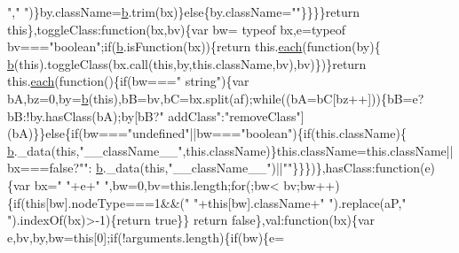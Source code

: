 \begin{DoxyCode}
{       "},\textcolor{stringliteral}{" "})\}by.className=\hyperlink{a00039_aa4026ad5544b958e54ce5e106fa1c805}{b}.trim(bx)\}\textcolor{keywordflow}{else}\{by.className=\textcolor{stringliteral}{""}\}\}\}\}\textcolor{keywordflow}{return} \textcolor{keyword}{this}\},toggleClass:\textcolor{keyword}{function}(bx,bv)\{var bw=
      typeof bx,e=typeof bv===\textcolor{stringliteral}{"boolean"};\textcolor{keywordflow}{if}(\hyperlink{a00039_aa4026ad5544b958e54ce5e106fa1c805}{b}.isFunction(bx))\{\textcolor{keywordflow}{return} this.\hyperlink{a00039_a871ff39db627c54c710a3e9909b8234c}{each}(\textcolor{keyword}{function}(by)\{
      \hyperlink{a00039_aa4026ad5544b958e54ce5e106fa1c805}{b}(\textcolor{keyword}{this}).toggleClass(bx.call(\textcolor{keyword}{this},by,\textcolor{keyword}{this}.className,bv),bv)\})\}\textcolor{keywordflow}{return} this.\hyperlink{a00039_a871ff39db627c54c710a3e9909b8234c}{each}(\textcolor{keyword}{function}()\{\textcolor{keywordflow}{if}(bw===\textcolor{stringliteral}{"
      string"})\{var bA,bz=0,by=\hyperlink{a00039_aa4026ad5544b958e54ce5e106fa1c805}{b}(\textcolor{keyword}{this}),bB=bv,bC=bx.split(af);\textcolor{keywordflow}{while}((bA=bC[bz++]))\{bB=e?bB:!by.hasClass(bA);by[bB?\textcolor{stringliteral}{"
      addClass"}:\textcolor{stringliteral}{"removeClass"}](bA)\}\}\textcolor{keywordflow}{else}\{\textcolor{keywordflow}{if}(bw===\textcolor{stringliteral}{"undefined"}||bw===\textcolor{stringliteral}{"boolean"})\{\textcolor{keywordflow}{if}(this.className)\{
      \hyperlink{a00039_aa4026ad5544b958e54ce5e106fa1c805}{b}.\_data(\textcolor{keyword}{this},\textcolor{stringliteral}{"\_\_className\_\_"},this.className)\}this.className=this.className||bx===\textcolor{keyword}{false}?\textcolor{stringliteral}{""}:
      \hyperlink{a00039_aa4026ad5544b958e54ce5e106fa1c805}{b}.\_data(\textcolor{keyword}{this},\textcolor{stringliteral}{"\_\_className\_\_"})||\textcolor{stringliteral}{""}\}\}\})\},hasClass:\textcolor{keyword}{function}(e)\{var bx=\textcolor{stringliteral}{" "}+e+\textcolor{stringliteral}{" "},bw=0,bv=this.length;\textcolor{keywordflow}{for}(;bw<
      bv;bw++)\{\textcolor{keywordflow}{if}(\textcolor{keyword}{this}[bw].nodeType===1&&(\textcolor{stringliteral}{" "}+\textcolor{keyword}{this}[bw].className+\textcolor{stringliteral}{" "}).replace(aP,\textcolor{stringliteral}{" "}).indexOf(bx)>-1)\{\textcolor{keywordflow}{return} \textcolor{keyword}{true}\}\}\textcolor{keywordflow}{
      return} \textcolor{keyword}{false}\},val:\textcolor{keyword}{function}(bx)\{var e,bv,by,bw=\textcolor{keyword}{this}[0];\textcolor{keywordflow}{if}(!arguments.length)\{\textcolor{keywordflow}{if}(bw)\{e=

\end{DoxyCode}
